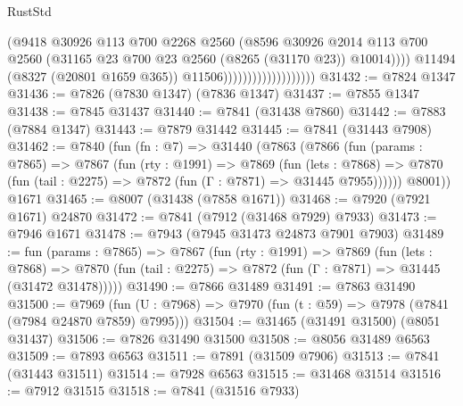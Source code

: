 \begin{lexlean}{RustStd}
\begin{coremodule}
{\begin{coremodule}
{{{{{{{{{{{{{{{{{{{{{{{{{{{{{{{{{{{{{{{{{{{{{{{{{{{{{{                                            (@9418
                                              @30926
                                              @113
                                              @700
                                              @2268
                                              @2560
                                              (@8596
                                                @30926
                                                @2014
                                                @113
                                                @700
                                                @2560
                                                (@31165
                                                  @23
                                                  @700
                                                  @23
                                                  @2560
                                                  (@8265 (@31170 @23))
                                                  @10014))))
                                          @11494
                                          (@8327 (@20801 @1659 @365))
                                          @11506)))))))))))))))))))
@31432 := @7824 @1347
@31436 := @7826 (@7830 @1347) (@7836 @1347)
@31437 := @7855 @1347
@31438 := @7845 @31437
@31440 := @7841 (@31438 @7860)
@31442 := @7883 (@7884 @1347)
@31443 := @7879 @31442
@31445 := @7841 (@31443 @7908)
@31462 := @7840
    (fun (fn : @7) =>
    @31440
      (@7863
        (@7866
          (fun (params : @7865) =>
          @7867
            (fun (rty : @1991) =>
            @7869
              (fun (lets : @7868) =>
              @7870 (fun (tail : @2275) => @7872 (fun (Γ : @7871) => @31445 @7955))))))
        @8001))
    @1671
@31465 := @8007 (@31438 (@7858 @1671))
@31468 := @7920 (@7921 @1671) @24870
@31472 := @7841 (@7912 (@31468 @7929) @7933)
@31473 := @7946 @1671
@31478 := @7943 (@7945 @31473 @24873 @7901 @7903)
@31489 := fun (params : @7865) =>
  @7867
    (fun (rty : @1991) =>
    @7869
      (fun (lets : @7868) =>
      @7870 (fun (tail : @2275) => @7872 (fun (Γ : @7871) => @31445 (@31472 @31478)))))
@31490 := @7866 @31489
@31491 := @7863 @31490
@31500 := @7969
    (fun (U : @7968) => @7970 (fun (t : @59) => @7978 (@7841 (@7984 @24870 @7859) @7995)))
@31504 := @31465 (@31491 @31500) (@8051 @31437)
@31506 := @7826 @31490 @31500
@31508 := @8056 @31489 @6563
@31509 := @7893 @6563
@31511 := @7891 (@31509 @7906)
@31513 := @7841 (@31443 @31511)
@31514 := @7928 @6563
@31515 := @31468 @31514
@31516 := @7912 @31515
@31518 := @7841 (@31516 @7933)
}}}}}}}}}}}}}}}}}}}}}}}}}}}}}}}}}}}}}}}}}}}}}}}}}}}}}}
\end{coremodule}}
\end{coremodule}
\end{lexlean}
